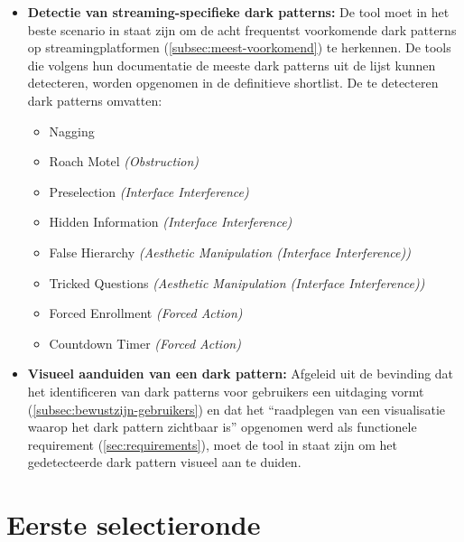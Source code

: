 \begin{itemize}
    \item \textbf{Detectie van streaming-specifieke dark patterns:} De tool moet in het beste scenario in staat zijn om de acht frequentst voorkomende dark patterns op streamingplatformen (\ref{subsec:meest-voorkomend}) te herkennen. De tools die volgens hun documentatie de meeste dark patterns uit de lijst kunnen detecteren, worden opgenomen in de definitieve shortlist. De te detecteren dark patterns omvatten:
    \begin{itemize}
        \item Nagging
        \item Roach Motel \textit{(Obstruction)}
        \item Preselection \textit{(Interface Interference)}
        \item Hidden Information \textit{(Interface Interference)}
        \item False Hierarchy \textit{(Aesthetic Manipulation (Interface Interference))}
        \item Tricked Questions \textit{(Aesthetic Manipulation (Interface Interference))}
        \item Forced Enrollment \textit{(Forced Action)}
        \item Countdown Timer \textit{(Forced Action)}
    \end{itemize}
    
    \item \textbf{Visueel aanduiden van een dark pattern:} Afgeleid uit de bevinding dat het identificeren van dark patterns voor gebruikers een uitdaging vormt (\ref{subsec:bewustzijn-gebruikers}) en dat het ``raadplegen van een visualisatie waarop het dark pattern zichtbaar is'' opgenomen werd als functionele requirement (\ref{sec:requirements}), moet de tool in staat zijn om het gedetecteerde dark pattern visueel aan te duiden. 
\end{itemize}

\vspace{1em}

\section{Eerste selectieronde}
\label{sec:eersteselectie}

